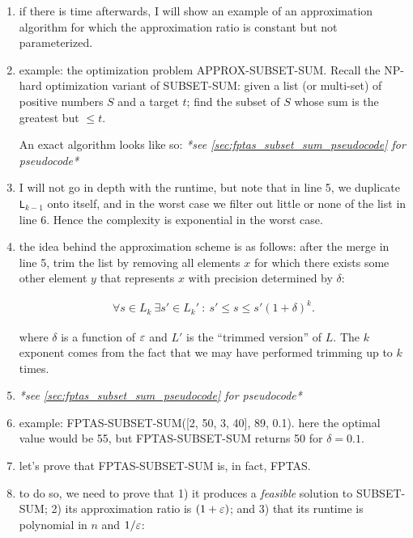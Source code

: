 \begin{enumerate}
  \item if there is time afterwards, I will show an example of an approximation
    algorithm for which the approximation ratio is constant but not
    parameterized.

  \item example: the optimization problem APPROX-SUBSET-SUM. Recall the NP-hard
    optimization variant of SUBSET-SUM: given a list (or multi-set) of positive
    numbers $S$ and a target $t$; find the subset of $S$ whose sum is the
    greatest but $\leq t$.

    An exact algorithm looks like so: \emph{*see
    \cref{sec:fptas_subset_sum_pseudocode} for pseudocode*}

  \item I will not go in depth with the runtime, but note that in line 5, we
    duplicate \texttt{L}$_{k - 1}$ onto itself, and in the worst case we filter
    out little or none of the list in line 6. Hence the complexity is
    exponential in the worst case.
    
  \item the idea behind the approximation scheme is as follows: after the merge
    in line 5, trim the list by removing all elements $x$ for which there exists
    some other element $y$ that represents $x$ with precision determined by
    $\delta$:

    \begin{textred}
      \begin{align}
        \forall s \in L_k\  \exists s' \in L_k'\ :\ s' \leq s \leq s' (1 +
        \delta)^k.
      \end{align}
    \end{textred}

    where $\delta$ is a function of $\varepsilon$ and $L'$ is the ``trimmed version''
    of $L$. The $k$ exponent comes from the fact that we may have performed
    trimming up to $k$ times.

  \item \emph{*see \cref{sec:fptas_subset_sum_pseudocode} for pseudocode*}

  \item example: FPTAS-SUBSET-SUM([2, 50, 3, 40], 89, 0.1). here the optimal
    value would be 55, but FPTAS-SUBSET-SUM returns 50 for $\delta = 0.1$.

  \item let's prove that FPTAS-SUBSET-SUM is, in fact, FPTAS.

  \item to do so, we need to prove that 1) it produces a \emph{feasible}
    solution to SUBSET-SUM; 2) its approximation ratio is $(1 + \varepsilon)$; and 3)
    that its runtime is polynomial in $n$ and $1/\varepsilon$:


\end{enumerate}
